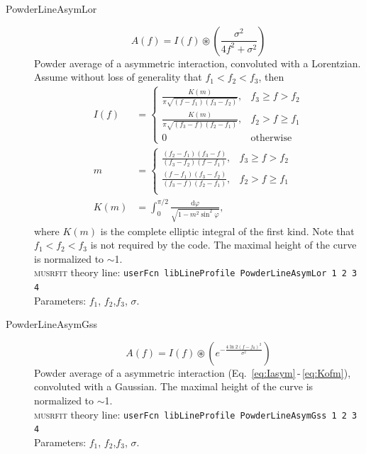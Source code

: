 \documentclass[twoside]{article}
\newcommand{\musrfit}{\textsc{musrfit}\xspace}
\begin{document}
\begin{description}
\item[PowderLineAsymLor]
   \begin{equation}
    A(f)= I(f)\circledast\left( \frac{\sigma^2}{4f^2+\sigma^2} \right)
   \end{equation}
   Powder average of a asymmetric interaction, convoluted with a Lorentzian. 
   Assume without loss of generality that $f_1<f_2<f_3$, then
   \begin{align}\label{eq:Iasym}
      I(f)&=\left\{\begin{matrix}
        \frac{K(m)}{\pi\sqrt{(f-f_1)(f_3-f_2)}},& f_3\geq f>f_2 \\[9pt]
        \frac{K(m)}{\pi\sqrt{(f_3-f)(f_2-f_1)}},& f_2>f\geq f_1\\[9pt]
        0 & \text{otherwise}
      \end{matrix} \right.  \\
      m&=\left\{\begin{matrix}
        \frac{(f_2-f_1)(f_3-f)}{(f_3-f_2)(f-f_1)},& f_3\geq f>f_2 \\[6pt]
        \frac{(f-f_1)(f_3-f_2)}{(f_3-f)(f_2-f_1)},& f_2>f\geq f_1\\[6pt]
      \end{matrix} \right.  \\\label{eq:Kofm}
      K(m)&=\int_0^{\pi/2}\frac{\mathrm d\varphi}{\sqrt{1-m^2\sin^2{\varphi}}},
   \end{align}
   where $K(m)$ is the complete elliptic integral of the first kind.
   Note that $f_1<f_2<f_3$ is not required by the code.
   The maximal height of the curve is normalized to $\sim$1.
   \\[1.5ex]
   \musrfit theory line: \verb?userFcn libLineProfile PowderLineAsymLor 1 2 3 4?
\\[1.5ex]
    Parameters: $f_1$, $f_2$,$f_3$, $\sigma$. 

\item[PowderLineAsymGss]
   \begin{equation}
    A(f)= I(f)\circledast\left(e^{-\frac{4\ln 2 (f-f_0)^2}{ \sigma^2}} \right)
   \end{equation}
   Powder average of a asymmetric interaction {(Eq.~\ref{eq:Iasym}\,-\,\ref{eq:Kofm})}, convoluted with a Gaussian. 
   The maximal height of the curve is normalized to $\sim$1.
   \\[1.5ex]
   \musrfit theory line: \verb?userFcn libLineProfile PowderLineAsymGss 1 2 3 4?
\\[1.5ex]
    Parameters: $f_1$, $f_2$,$f_3$, $\sigma$. 
\end{description}
\end{document}

